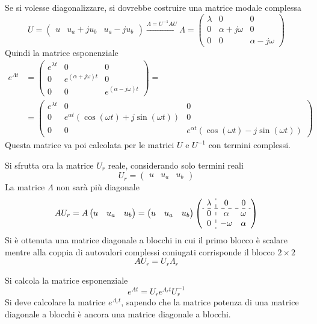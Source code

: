 Se si volesse diagonalizzare, si dovrebbe costruire una matrice modale complessa
$$
U=\begin{pmatrix}u & u_a+ju_b & u_a-ju_b\end{pmatrix}
\stackrel{\Lambda=U^{-1}AU}{\longrightarrow}\Lambda=
\begin{pmatrix}
\lambda & 0 & 0\\
0 & \alpha+j\omega & 0 \\
0 & 0 & \alpha -j\omega
\end{pmatrix}
$$
Quindi la matrice esponenziale
$$\begin{aligned}
e^{\Lambda t} &= \begin{pmatrix}
e^{\lambda t} & 0 & 0 \\
0 & e^{(\alpha +j\omega)t} & 0 \\
0 & 0 & e^{(\alpha - j\omega)t}
\end{pmatrix} =\\
&=\begin{pmatrix}
e^{\lambda t} & 0 & 0 \\
0 & e^{\alpha t}(\cos(\omega t) + j\sin(\omega t)) & 0\\
0 & 0 & e^{\alpha t}(\cos(\omega t) - j\sin(\omega t))
\end{pmatrix}
\end{aligned}$$
Questa matrice va poi calcolata per le matrici $U$ e $U^{-1}$ con termini
complessi.

Si sfrutta ora la matrice $U_r$ reale, considerando solo termini reali
$$
U_r = \begin{pmatrix}
u & u_a & u_b
\end{pmatrix}
$$
La matrice $\Lambda$ non sarà più diagonale
$$
AU_r = A\begin{pmatrix}
u & u_a & u_b
\end{pmatrix} =
\begin{pmatrix}
u & u_a & u_b
\end{pmatrix}\left(
\begin{array}{c:cc}
\lambda & 0 & 0\\ \hdashline
0 &\alpha &\omega \\
0 &-\omega &\alpha \\
\end{array}\right)
$$
Si è ottenuta una matrice diagonale a blocchi in cui il primo blocco è scalare
mentre alla coppia di autovalori complessi coniugati corrisponde il blocco
$2\times2$
$$
AU_r = U_r \Lambda_r
$$

Si calcola la matrice esponenziale
$$
e^{At} = U_r e^{\Lambda_r t}U_r^{-1}
$$
Si deve calcolare la matrice $e^{\Lambda_r t}$, sapendo che la matrice potenza
di una matrice diagonale a blocchi è ancora una matrice diagonale a blocchi.

